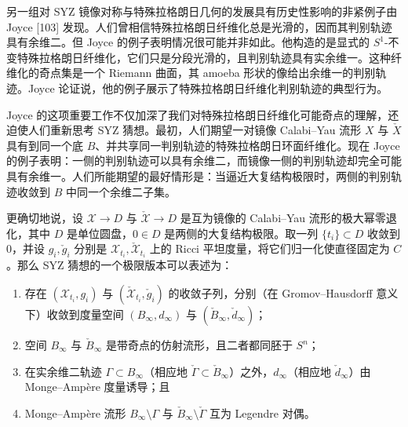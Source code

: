 另一组对 SYZ 镜像对称与特殊拉格朗日几何的发展具有历史性影响的非紧例子由 Joyce [103] 发现。人们曾相信特殊拉格朗日纤维化总是光滑的，因而其判别轨迹具有余维二。但 Joyce 的例子表明情况很可能并非如此。他构造的是显式的 $S^1$-不变特殊拉格朗日纤维化，它们只是分段光滑的，且判别轨迹具有实余维一。这种纤维化的奇点集是一个 Riemann 曲面，其 amoeba 形状的像给出余维一的判别轨迹。Joyce 论证说，他的例子展示了特殊拉格朗日纤维化判别轨迹的典型行为。

Joyce 的这项重要工作不仅加深了我们对特殊拉格朗日纤维化可能奇点的理解，还迫使人们重新思考 SYZ 猜想。最初，人们期望一对镜像 Calabi--Yau 流形 $X$ 与 $\check X$ 具有到同一个底 $B$、并共享同一判别轨迹的特殊拉格朗日环面纤维化。现在 Joyce 的例子表明：一侧的判别轨迹可以具有余维二，而镜像一侧的判别轨迹却完全可能具有余维一。人们所能期望的最好情形是：当逼近大复结构极限时，两侧的判别轨迹收敛到 $B$ 中同一个余维二子集。

更确切地说，设 $\mathcal{X}\to D$ 与 $\check{\mathcal{X}}\to D$ 是互为镜像的 Calabi--Yau 流形的极大幂零退化，其中 $D$ 是单位圆盘，$0\in D$ 是两侧的大复结构极限。取一列 $\{t_i\}\subset D$ 收敛到 $0$，并设 $g_i,\check g_i$ 分别是 $\mathcal{X}_{t_i},\check{\mathcal{X}}_{t_i}$ 上的 Ricci 平坦度量，将它们归一化使直径固定为 $C$。那么 SYZ 猜想的一个极限版本可以表述为：
\begin{enumerate}
\item[(i)] 存在 $(\mathcal{X}_{t_i},g_i)$ 与 $(\check{\mathcal{X}}_{t_i},\check g_i)$ 的收敛子列，分别（在 Gromov--Hausdorff 意义下）收敛到度量空间 $(B_\infty,d_\infty)$ 与 $(\check B_\infty,\check d_\infty)$；
\item[(ii)] 空间 $B_\infty$ 与 $\check B_\infty$ 是带奇点的仿射流形，且二者都同胚于 $S^n$；
\item[(iii)] 在实余维二轨迹 $\Gamma\subset B_\infty$（相应地 $\check\Gamma\subset\check B_\infty$）之外，$d_\infty$（相应地 $\check d_\infty$）由 Monge--Ampère 度量诱导；且
\item[(iv)] Monge--Ampère 流形 $B_\infty\setminus\Gamma$ 与 $\check B_\infty\setminus\check\Gamma$ 互为 Legendre 对偶。
\end{enumerate}

